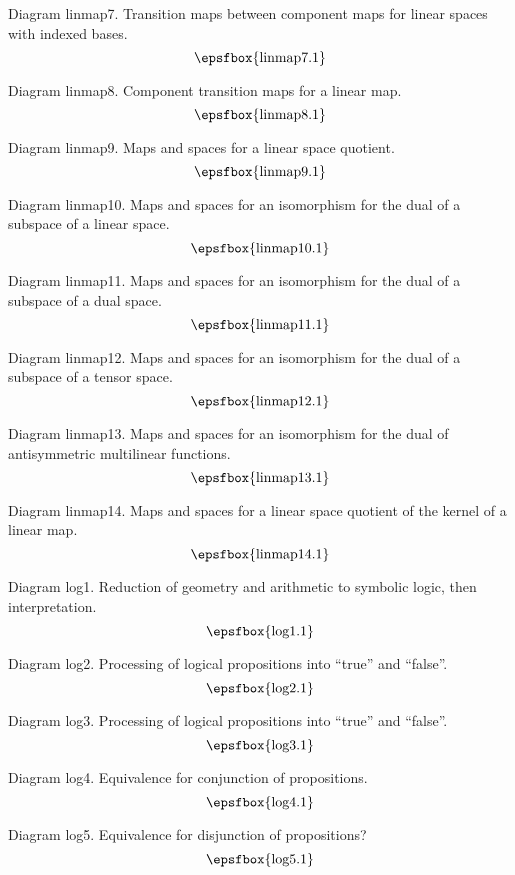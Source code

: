 Diagram linmap7. Transition maps between component maps for linear spaces with
indexed bases.
$$
\centerline{\epsfbox{linmap7.1}}
$$

\filleject

Diagram linmap8. Component transition maps for a linear map.
$$
\centerline{\epsfbox{linmap8.1}}
$$

Diagram linmap9. Maps and spaces for a linear space quotient.
$$
\centerline{\epsfbox{linmap9.1}}
$$

Diagram linmap10. Maps and spaces for an isomorphism for the dual of a subspace
of a linear space.
$$
\centerline{\epsfbox{linmap10.1}}
$$

Diagram linmap11. Maps and spaces for an isomorphism for the dual of a subspace
of a dual space.
$$
\centerline{\epsfbox{linmap11.1}}
$$

\filleject

Diagram linmap12. Maps and spaces for an isomorphism for the dual of a subspace
of a tensor space.
$$
\centerline{\epsfbox{linmap12.1}}
$$

Diagram linmap13. Maps and spaces for an isomorphism for the dual of
antisymmetric multilinear functions.
$$
\centerline{\epsfbox{linmap13.1}}
$$

Diagram linmap14. Maps and spaces for a linear space quotient of the kernel of a
linear map.
$$
\centerline{\epsfbox{linmap14.1}}
$$

\secteject
\edef\SECTlog{\the\pageno}

Diagram log1. Reduction of geometry and arithmetic to symbolic logic, then
interpretation.
$$
\centerline{\epsfbox{log1.1}}
$$

Diagram log2. Processing of logical propositions into ``true'' and ``false''.
$$
\centerline{\epsfbox{log2.1}}
$$

Diagram log3. Processing of logical propositions into ``true'' and ``false''.
$$
\centerline{\epsfbox{log3.1}}
$$

Diagram log4. Equivalence for conjunction of propositions.
$$
\centerline{\epsfbox{log4.1}}
$$

Diagram log5. Equivalence for disjunction of propositions?
$$
\centerline{\epsfbox{log5.1}}
$$

\filleject

